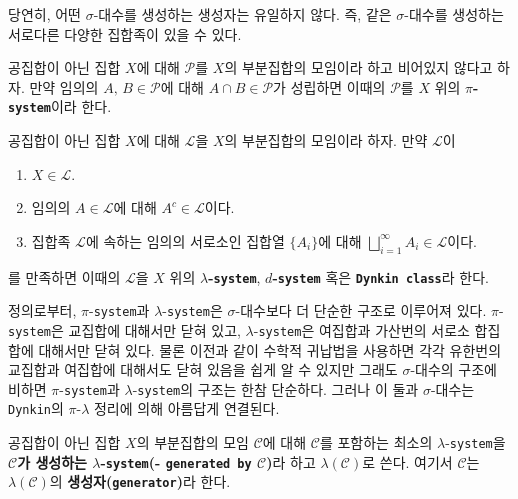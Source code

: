 당연히, 어떤 $\sigma$-대수를 생성하는 생성자는 유일하지 않다. 즉, 같은 $\sigma$-대수를 생성하는 서로다른 다양한 집합족이 있을 수 있다.

\begin{definition}
    공집합이 아닌 집합 $X$에 대해 $\mathcal{P}$를 $X$의 부분집합의 모임이라 하고 비어있지 않다고 하자. 만약 임의의 $A,\,B\in\mathcal{P}$에 대해 $A\cap B\in\mathcal{P}$가 성립하면 이때의 $\mathcal{P}$를 $X$ 위의 \textbf{$\pi$-\texttt{system}}이라 한다.
\end{definition}

\begin{definition}\label{def:lambdaSys}
    공집합이 아닌 집합 $X$에 대해 $\mathcal{L}$을 $X$의 부분집합의 모임이라 하자. 만약 $\mathcal{L}$이
    \begin{enumerate}
        \item $X\in\mathcal{L}$.
        \item 임의의 $A\in\mathcal{L}$에 대해 $A^c\in\mathcal{L}$이다.
        \item 집합족 $\mathcal{L}$에 속하는 임의의 서로소인 집합열 $\{A_i\}$에 대해 $\bigsqcup_{i=1}^\infty A_i\in\mathcal{L}$이다.
    \end{enumerate}
    를 만족하면 이때의 $\mathcal{L}$을 $X$ 위의 \textbf{$\lambda$-\texttt{system}}, \textbf{$d$-\texttt{system}} 혹은 \textbf{\texttt{Dynkin class}}라 한다.\footnotemark
\end{definition}

정의로부터, $\pi$-\texttt{system}과 $\lambda$-\texttt{system}은 $\sigma$-대수보다 더 단순한 구조로 이루어져 있다. $\pi$-\texttt{system}은 교집합에 대해서만 닫혀 있고, $\lambda$-\texttt{system}은 여집합과 가산번의 서로소 합집합에 대해서만 닫혀 있다. 물론 이전과 같이 수학적 귀납법을 사용하면 각각 유한번의 교집합과 여집합에 대해서도 닫혀 있음을 쉽게 알 수 있지만 그래도 $\sigma$-대수의 구조에 비하면 $\pi$-\texttt{system}과 $\lambda$-\texttt{system}의 구조는 한참 단순하다. 그러나 이 둘과 $\sigma$-대수는 \texttt{Dynkin}의 $\pi$-$\lambda$ 정리에 의해 아름답게 연결된다.

\begin{definition}
    공집합이 아닌 집합 $X$의 부분집합의 모임 $\mathcal{C}$에 대해 $\mathcal{C}$를 포함하는 최소의 $\lambda$-\texttt{system}을 \textbf{$\mathcal{C}$가 생성하는 $\lambda$-\texttt{system}(- \texttt{generated by} $\mathcal{C}$)}라 하고 $\lambda(\mathcal{C})$로 쓴다. 여기서 $\mathcal{C}$는 $\lambda(\mathcal{C})$의 \textbf{생성자(\texttt{generator})}라 한다.
\end{definition}

